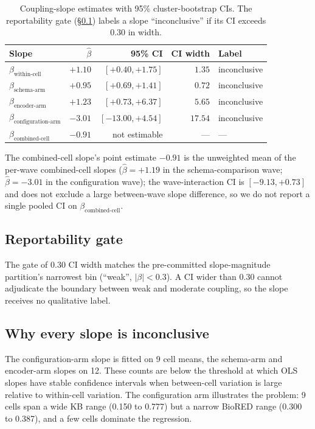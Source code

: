 \begin{table}[H]
\centering
\caption{Coupling-slope estimates with 95\% cluster-bootstrap CIs.
The reportability gate (\S\ref{sec:s7-gate}) labels a slope
``inconclusive'' if its CI exceeds 0.30 in width.}
\label{tab:s7-slopes}
\small
\begin{tabular}{@{}lrrrl@{}}
\toprule
\textbf{Slope} & \textbf{$\hat\beta$} & \textbf{95\% CI} & \textbf{CI width} & \textbf{Label} \\
\midrule
$\beta_{\text{within-cell}}$       & $+1.10$  & $[+0.40, +1.75]$  & $1.35$  & inconclusive \\
$\beta_{\text{schema-arm}}$        & $+0.95$  & $[+0.69, +1.41]$  & $0.72$  & inconclusive \\
$\beta_{\text{encoder-arm}}$       & $+1.23$  & $[+0.73, +6.37]$  & $5.65$  & inconclusive \\
$\beta_{\text{configuration-arm}}$ & $-3.01$  & $[-13.00, +4.54]$ & $17.54$ & inconclusive \\
$\beta_{\text{combined-cell}}$     & $-0.91$  & not estimable     & ---     & --- \\
\bottomrule
\end{tabular}
\end{table}

The combined-cell slope's point estimate $-0.91$ is the unweighted
mean of the per-wave combined-cell slopes ($\hat\beta = +1.19$ in
the schema-comparison wave; $\hat\beta = -3.01$ in the
configuration wave); the wave-interaction CI is $[-9.13, +0.73]$
and does not exclude a large between-wave slope difference, so we
do not report a single pooled CI on
$\beta_{\text{combined-cell}}$.

\subsection{Reportability gate}
\label{sec:s7-gate}

The gate of 0.30 CI width matches the pre-committed slope-magnitude
partition's narrowest bin (``weak'', $|\beta| < 0.3$). A CI wider
than 0.30 cannot adjudicate the boundary between weak and moderate
coupling, so the slope receives no qualitative label.

\subsection{Why every slope is inconclusive}

The configuration-arm slope is fitted on 9 cell means, the schema-arm
and encoder-arm slopes on 12. These counts are below the threshold
at which OLS slopes have stable confidence intervals when between-cell
variation is large relative to within-cell variation. The
configuration arm illustrates the problem: 9 cells span a wide KB
range (0.150 to 0.777) but a narrow BioRED range (0.300 to 0.387),
and a few cells dominate the regression.

